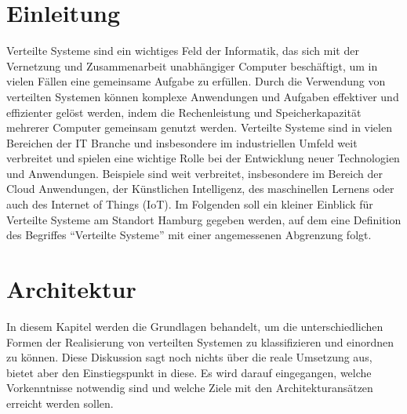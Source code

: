 \documentclass[a4paper]{article}
\begin{document}
\tableofcontents
\newpage

\newpage
\section{Einleitung}
Verteilte Systeme sind ein wichtiges Feld der Informatik, das sich mit der Vernetzung und Zusammenarbeit unabhängiger Computer beschäftigt, um in vielen Fällen eine gemeinsame Aufgabe zu erfüllen. Durch die Verwendung von verteilten Systemen können komplexe Anwendungen und Aufgaben effektiver und effizienter gelöst werden, indem die Rechenleistung und Speicherkapazität mehrerer Computer gemeinsam genutzt werden. Verteilte Systeme sind in vielen Bereichen der IT Branche und insbesondere im industriellen Umfeld weit verbreitet und spielen eine wichtige Rolle bei der Entwicklung neuer Technologien und Anwendungen. Beispiele sind weit verbreitet, insbesondere im Bereich der Cloud Anwendungen, der Künstlichen Intelligenz, des maschinellen Lernens oder auch des Internet of Things (IoT). Im Folgenden soll ein kleiner Einblick für Verteilte Systeme am Standort Hamburg gegeben werden, auf dem eine Definition des Begriffes \enquote{Verteilte Systeme}  mit einer angemessenen Abgrenzung folgt. 





\newpage
\newpage
\section{Architektur}
In diesem Kapitel werden die Grundlagen behandelt, um die unterschiedlichen Formen der Realisierung von verteilten Systemen zu klassifizieren und einordnen zu können. Diese Diskussion sagt noch nichts über die reale Umsetzung aus, bietet aber den Einstiegspunkt in diese. Es wird darauf eingegangen, welche Vorkenntnisse notwendig sind und welche Ziele mit den Architekturansätzen erreicht werden sollen. 

 



\end{document}
